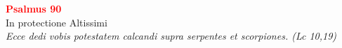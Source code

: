 


\def\greinitialformat#1{%
{\fontsize{39}{39}\selectfont #1}%
}




\vspace{0.3cm}
\begin{center}
 \textcolor{red}{\large \bf Psalmus 90}\\
In protectione Altissimi\\
\textit{\small Ecce dedi vobis potestatem calcandi supra serpentes et scorpiones. (Lc 10,19)}
\end{center}
